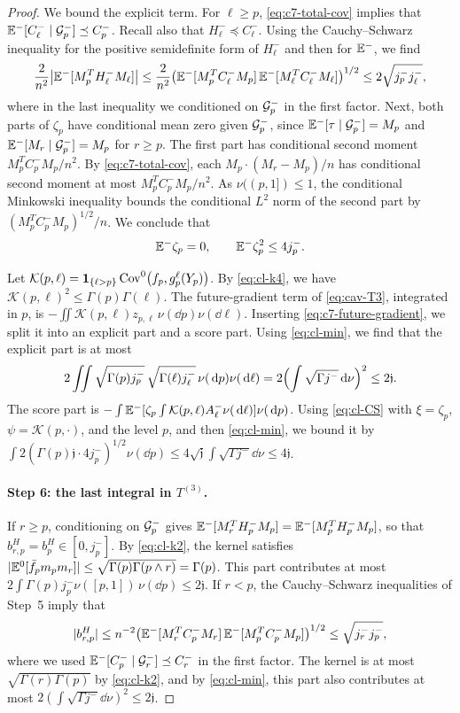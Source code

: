 \begin{proof}
We bound the explicit term. For $\ell\ge p$, \eqref{eq:c7-total-cov}
implies that $\mathbb E^-[C_\ell^-\mid\mathcal G_p^-]\preceq C_p^-$. Recall also
that $H_\ell^-\preceq C_\ell^-$. Using the Cauchy--Schwarz inequality
for the positive semidefinite form of $H_\ell^-$ and then for $\mathbb E^-$,
we find
\[
 \frac2{n^2}\bigl|\mathbb E^-[M_p^TH_\ell^-M_\ell]\bigr|
 \le\frac2{n^2}\bigl(\mathbb E^-[M_p^TC_\ell^-M_p]\,
 \mathbb E^-[M_\ell^TC_\ell^-M_\ell]\bigr)^{1/2}
 \le2\sqrt{j_p^-j_\ell^-},
\]
where in the last inequality we conditioned on $\mathcal G^-_p$ in the first
factor. Next, both parts of $\zeta_p$ have conditional mean zero given
$\mathcal G_p^-$, since $\mathbb E^-[\tau\mid\mathcal G^-_p]=M_p$ and
$\mathbb E^-[M_r\mid\mathcal G^-_p]=M_p$ for $r\ge p$. The first part has
conditional second moment $M_p^TC_p^-M_p/n^2$. By
\eqref{eq:c7-total-cov}, each $M_p\cdot(M_r-M_p)/n$ has conditional
second moment at most $M_p^TC_p^-M_p/n^2$. As $\nu((p,1])\le1$, the
conditional Minkowski inequality bounds the conditional $L^2$ norm of
the second part by $(M_p^TC_p^-M_p)^{1/2}/n$. We conclude that
\[
 \mathbb E^-\zeta_p=0,\qquad\mathbb E^-\zeta_p^2\le4j_p^-.
\]

Let
$\mathcal K(p,\ell)=\mathbf1_{\{\ell>p\}}\operatorname{Cov}^0\bigl(f_p,g_p^\ell(Y_p)\bigr)$.
By \eqref{eq:cl-k4}, we have $\mathcal K(p,\ell)^2\le\Gamma(p)\Gamma(\ell)$.
The future-gradient term of \eqref{eq:cav-T3}, integrated in $p$, is
$-\iint\mathcal K(p,\ell)z_{p,\ell}\,\nu(\dd p)\nu(\dd\ell)$. Inserting
\eqref{eq:c7-future-gradient}, we split it into an explicit part and a
score part. Using \eqref{eq:cl-min}, we find that the explicit part is
at most
\[
 2\iint\sqrt{\Gamma(p)j_p^-}\,\sqrt{\Gamma(\ell)j_\ell^-}\,
 \nu(\,\mathrm d p)\nu(\,\mathrm d\ell)
 =2\Bigl(\int\sqrt{\Gamma j^-}\,\mathrm d\nu\Bigr)^2\le2\mathfrak j.
\]
The score part is
$-\int\mathbb E^-[\zeta_p\int\mathcal K(p,\ell)A_\ell^-\nu(\,\mathrm d\ell)]\nu(\,\mathrm d p)$.
Using \eqref{eq:cl-CS} with $\xi=\zeta_p$, $\psi=\mathcal K(p,\cdot)$,
and the level $p$, and then \eqref{eq:cl-min}, we bound it by
$\int2(\Gamma(p)\mathfrak j\cdot4j_p^-)^{1/2}\nu(\dd p)
\le4\sqrt{\mathfrak j}\int\sqrt{\Gamma j^-}\dd\nu\le4\mathfrak j$.

\paragraph{Step 6: the last integral in $T^{(3)}$.}
If $r\ge p$, conditioning on $\mathcal G^-_p$ gives
$\mathbb E^-[M_r^TH_p^-M_p]=\mathbb E^-[M_p^TH_p^-M_p]$, so that
$b^H_{r,p}=b^H_p\in[0,j_p^-]$. By \eqref{eq:cl-k2}, the kernel
satisfies $|\mathbb E^0[\bar f_pm_pm_r]|\le\sqrt{\Gamma(p)\Gamma(p\wedge r)}
=\Gamma(p)$. This part contributes at most
$2\int\Gamma(p)j_p^-\nu([p,1])\,\nu(\dd p)\le2\mathfrak j$. If $r<p$,
the Cauchy--Schwarz inequalities of Step~5 imply that
\[
 |b^H_{r,p}|
 \le n^{-2}\bigl(\mathbb E^-[M_r^TC_p^-M_r]\,\mathbb E^-[M_p^TC_p^-M_p]\bigr)^{1/2}
 \le\sqrt{j_r^-j_p^-},
\]
where we used $\mathbb E^-[C_p^-\mid\mathcal G^-_r]\preceq C_r^-$ in the first
factor. The kernel is at most $\sqrt{\Gamma(r)\Gamma(p)}$ by
\eqref{eq:cl-k2}, and by \eqref{eq:cl-min}, this part also contributes
at most $2(\int\sqrt{\Gamma j^-}\dd\nu)^2\le2\mathfrak j$.


\end{proof}
